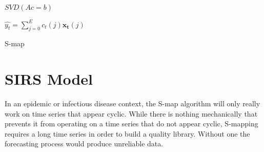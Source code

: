     \begin{algorithm}

        \BlankLine

        \DontPrintSemicolon


        \BlankLine


        \BlankLine


        \BlankLine

        $SVD(Ac = b)$

        \BlankLine

        $\hat{y_t} = \sum_{j = 0}^{E} c_t (j) \mathbf{x_t} (j)$

        \BlankLine


        \BlankLine

        \caption{S-map \label{smap}}

    \end{algorithm}


\section{SIRS Model}

	In an epidemic or infectious disease context, the S-map algorithm will only really work on time series that appear cyclic. While there is nothing mechanically that prevents it from operating on a time series that do not appear cyclic, S-mapping requires a long time series in order to build a quality library. Without one the forecasting process would produce unreliable data.

